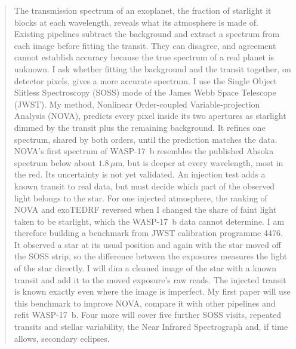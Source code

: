 \begin{abstract}
The transmission spectrum of an exoplanet, the fraction of starlight it blocks
at each wavelength, reveals what its atmosphere is made of. Existing pipelines
subtract the background and extract a spectrum from each image before fitting
the transit. They can disagree, and agreement cannot establish accuracy because
the true spectrum of a real planet is unknown. I ask whether fitting the
background and the transit together, on detector pixels, gives a more accurate
spectrum. I use the Single Object Slitless Spectroscopy (SOSS) mode of the
James Webb Space Telescope (JWST). My method, Nonlinear Order-coupled
Variable-projection Analysis (NOVA), predicts every pixel inside its two apertures as starlight dimmed by the transit plus the remaining background. It refines one spectrum, shared
by both orders, until the prediction matches the data. NOVA's first spectrum of
WASP-17~b resembles the published Ahsoka spectrum below about
$1.8\,\mu\mathrm{m}$, but is deeper at every wavelength, most in the red. Its
uncertainty is not yet validated. An injection test adds a known transit to
real data, but must decide which part of the observed light belongs to the star.
For one injected atmosphere, the ranking of NOVA and exoTEDRF reversed when I changed the
share of faint light taken to be starlight, which the WASP-17~b data cannot
determine. I am therefore building a benchmark from JWST calibration programme
4476. It observed a star at its usual position and again with the star moved off the SOSS
strip, so the difference between the exposures measures the light of the star
directly. I will dim a cleaned image of the star with a known transit and add
it to the moved exposure's raw reads. The injected transit is known exactly
even where the image is imperfect. My first paper will use this benchmark to
improve NOVA, compare it with other pipelines and refit WASP-17~b. Four more
will cover five further SOSS visits, repeated transits and stellar
variability, the Near Infrared Spectrograph and, if time allows, secondary
eclipses.
\end{abstract}

